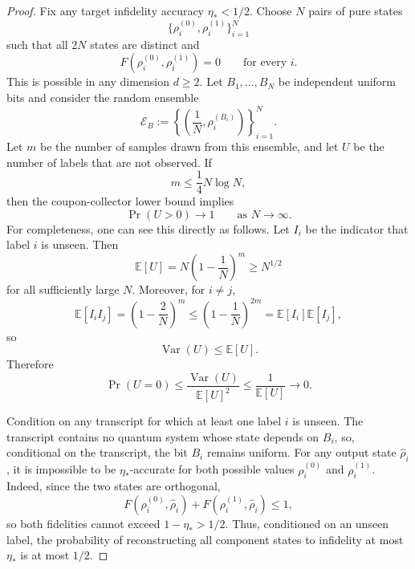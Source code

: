 \documentclass[aps,prx,reprint,superscriptaddress,amsmath,amssymb,longbibliography,floatfix]{revtex4-2}
\newcommand{\scE}{\mathcal{E}}
\theoremstyle{plain}
\theoremstyle{definition}
\theoremstyle{remark}
\begin{document}
\begin{proof}
Fix any target infidelity accuracy \(\eta_*<1/2\). Choose \(N\) pairs of pure
states
\[
    \{\rho_i^{(0)},\rho_i^{(1)}\}_{i=1}^N
\]
such that all \(2N\) states are distinct and
\[
    F(\rho_i^{(0)},\rho_i^{(1)})=0
    \qquad\text{for every }i.
\]
This is possible in any dimension \(d\ge2\). Let
\(B_1,\ldots,B_N\) be independent uniform bits and consider the random ensemble
\begin{equation}
    \scE_B
    :=
    \left\{
        \left(\frac1N,\rho_i^{(B_i)}\right)
    \right\}_{i=1}^N .
\label{eq:app-tomography-hard-ensemble}
\end{equation}
Let \(m\) be the number of samples drawn from this ensemble, and let \(U\) be
the number of labels that are not observed. If
\[
    m\le \frac14 N\log N,
\]
then the coupon-collector lower bound implies
\[
    \Pr(U>0)\to 1
    \qquad
    \text{as }N\to\infty .
\]
For completeness, one can see this directly as follows. Let \(I_i\) be the
indicator that label \(i\) is unseen. Then
\[
    \mathbb E[U]
    =
    N\left(1-\frac1N\right)^m
    \ge
    N^{1/2}
\]
for all sufficiently large \(N\). Moreover, for \(i\ne j\),
\[
    \mathbb E[I_iI_j]
    =
    \left(1-\frac2N\right)^m
    \le
    \left(1-\frac1N\right)^{2m}
    =
    \mathbb E[I_i]\mathbb E[I_j],
\]
so
\[
    \operatorname{Var}(U)\le \mathbb E[U].
\]
Therefore
\[
    \Pr(U=0)
    \le
    \frac{\operatorname{Var}(U)}{\mathbb E[U]^2}
    \le
    \frac1{\mathbb E[U]}
    \to 0.
\]

Condition on any transcript for which at least one label \(i\) is unseen. The
transcript contains no quantum system whose state depends on \(B_i\), so,
conditional on the transcript, the bit \(B_i\) remains uniform. For any output
state \(\widehat\rho_i\), it is impossible to be \(\eta_*\)-accurate for both
possible values \(\rho_i^{(0)}\) and \(\rho_i^{(1)}\). Indeed, since the two
states are orthogonal,
\begin{equation}
    F(\rho_i^{(0)},\widehat\rho_i)
    +
    F(\rho_i^{(1)},\widehat\rho_i)
    \le 1,
\label{eq:app-tomography-unseen-label-obstruction}
\end{equation}
so both fidelities cannot exceed \(1-\eta_*>1/2\). Thus, conditioned on an
unseen label, the probability of reconstructing all component states to
infidelity at most \(\eta_*\) is at most \(1/2\).


\end{proof}
\end{document}
